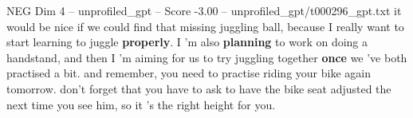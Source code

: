 \begin{textsample}{NEG Dim 4 – unprofiled\_gpt – Score -3.00 – unprofiled\_gpt/t000296\_gpt.txt}  \label{ex:f4_neg_027}
it would be nice if we could find that missing juggling ball, because I really want to start learning to juggle \textbf{properly}.
I ’m also \textbf{planning} to work on doing a handstand, and then I ’m aiming for us to try juggling together \textbf{once} we ’ve both practised a bit. and remember, you need to practise riding your bike again tomorrow. don't forget that you have to ask to have the bike seat adjusted the next time you see him, so it ’s the right height for you.

\end{textsample}
